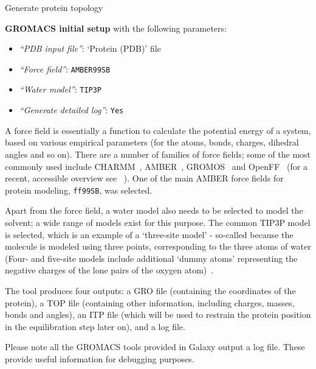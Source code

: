\documentclass[twocolumn]{bmcart}%
\providecommand{\tightlist}{%
  \setlength{\itemsep}{0pt}\setlength{\parskip}{0pt}}
\begin{document}
\begin{handson_box_colour}{Generate protein topology}

  \textbf{GROMACS initial setup} with the following parameters:

  \begin{itemize}
  \tightlist
  \item
    \emph{``PDB input file''}: `Protein (PDB)' file
  \item
    \emph{``Force field''}: \texttt{AMBER99SB}
  \item
    \emph{``Water model''}: \texttt{TIP3P}
  \item
    \emph{``Generate detailed log''}: \texttt{Yes}
  \end{itemize}
\end{handson_box_colour}

A force field is essentially a function to calculate the potential energy of a system, based on various empirical parameters (for the atoms, bonds, charges, dihedral angles and so on). There are a number of families of force fields; some of the most commonly used include CHARMM~\cite{Vanommeslaeghe2009}, AMBER~\cite{Maier2015}, GROMOS~\cite{reif2012} and OpenFF~\cite{Mobley2018} (for a recent, accessible overview see ~\cite{Lemkul2020}). One of the main AMBER force fields for protein modeling, \texttt{ff99SB}, was selected.

Apart from the force field, a water model also needs to be selected to model the solvent; a wide range of models exist for this purpose. The common TIP3P model is selected, which is an example of a `three-site model' - so-called because the molecule is modeled using three points, corresponding to the three atoms of water (Four- and five-site models include additional `dummy atoms' representing the negative charges of the lone pairs of the oxygen atom)~\cite{Onufriev2017}.

The tool produces four outputs: a GRO file (containing the coordinates
of the protein), a TOP file (containing other information, including
charges, masses, bonds and angles), an ITP file (which will be used to
restrain the protein position in the equilibration step later on), and a
log file.

Please note all the GROMACS tools provided in Galaxy output a log file. These provide useful information for
debugging purposes.
\end{document}
